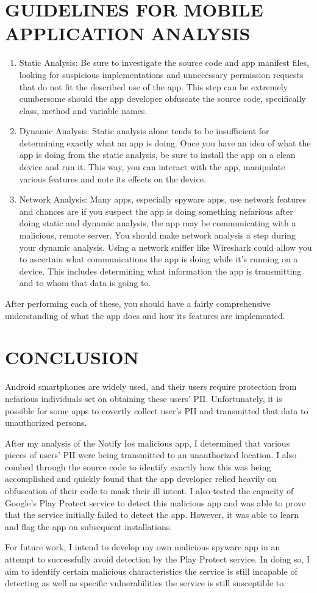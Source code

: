 \documentclass[conference]{IEEEtran}
\begin{document}
\section{GUIDELINES FOR MOBILE APPLICATION ANALYSIS}
\begin{enumerate}
    \item Static Analysis: Be sure to investigate the source code and app manifest files, looking for suspicious implementations and unnecessary permission requests that do not fit the described use of the app. This step can be extremely cumbersome should the app developer obfuscate the source code, specifically class, method and variable names. 
    \item Dynamic Analysis: Static analysis alone tends to be insufficient for determining exactly what an app is doing. Once you have an idea of what the app is doing from the static analysis, be sure to install the app on a clean device and run it. This way, you can interact with the app, manipulate various features and note its effects on the device.
    \item Network Analysis: Many apps, especially spyware apps, use network features and chances are if you suspect the app is doing something nefarious after doing static and dynamic analysis, the app may be communicating with a malicious, remote server. You should make network analysis a step during your dynamic analysis. Using a network sniffer like Wireshark could allow you to ascertain what communications the app is doing while it’s running on a device. This includes determining what information the app is transmitting and to whom that data is going to.
\end{enumerate}
After performing each of these, you should
have a fairly comprehensive understanding
of what the app does and how its features
are implemented.
\section{CONCLUSION}
Android smartphones are widely used, and
their users require protection from nefarious
individuals set on obtaining these users’ PII.
Unfortunately, it is possible for some apps
to covertly collect user’s PII and transmitted
that data to unauthorized persons.
\par After my analysis of the Notify Ios malicious app, I determined that various pieces  of users’ PII were being transmitted to an unauthorized location. I also combed through the source code to identify exactly how this was being accomplished and quickly found that the app developer relied heavily on obfuscation of their code to mask their ill intent. I also tested the capacity of Google’s Play Protect service to detect this malicious app and was able to prove that the service initially failed to detect the app. However, it was able to learn and flag the app on subsequent installations.
\par For future work, I intend to develop my own malicious spyware app in an attempt to successfully avoid detection by the Play Protect service. In doing so, I aim to identify certain malicious characteristics the service is still incapable of detecting as well as specific vulnerabilities the service is still susceptible to.
\end{document}
